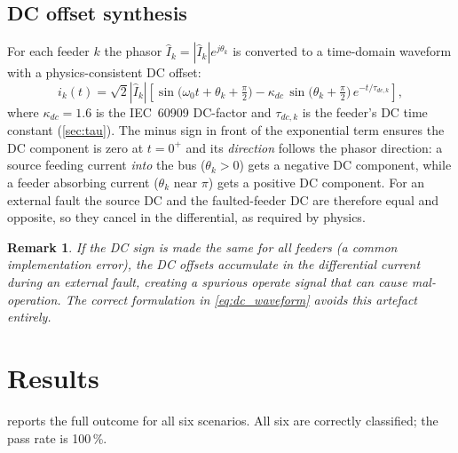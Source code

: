 \documentclass[12pt,a4paper]{article}
\newtheorem{remark}{Remark}[section]
\newcommand{\abs}[1]{\left|#1\right|}
\begin{document}
\subsection{DC offset synthesis}
\label{sec:dc}

For each feeder $k$ the phasor $\hat{I}_k = \abs{\hat{I}_k}e^{j\theta_k}$ is
converted to a time-domain waveform with a physics-consistent DC offset:
\begin{equation}
  i_k(t) = \sqrt{2}\abs{\hat{I}_k}
            \!\left[\sin\!\bigl(\omega_0 t + \theta_k + \tfrac{\pi}{2}\bigr)
                    - \kappa_{dc}\,\sin\!\bigl(\theta_k + \tfrac{\pi}{2}\bigr)\,
                      e^{-t/\tau_{dc,k}}\right],
  \label{eq:dc_waveform}
\end{equation}
where $\kappa_{dc}=1.6$ is the IEC~60909 DC-factor and $\tau_{dc,k}$ is the
feeder's DC time constant (\cref{sec:tau}).  The minus sign in front of the
exponential term ensures the DC component is zero at $t=0^+$ and its
\emph{direction} follows the phasor direction: a source feeding current
\emph{into} the bus ($\theta_k > 0$) gets a negative DC component, while a
feeder absorbing current ($\theta_k$ near $\pi$) gets a positive DC component.
For an external fault the source DC and the faulted-feeder DC are therefore
equal and opposite, so they cancel in the differential, as required by
physics.

\begin{remark}
  If the DC sign is made the same for all feeders (a common implementation
  error), the DC offsets \emph{accumulate} in the differential current during
  an external fault, creating a spurious operate signal that can cause
  mal-operation.  The correct formulation in \cref{eq:dc_waveform} avoids
  this artefact entirely.
\end{remark}

\section{Results}
\label{sec:results}

 reports the full outcome for all six scenarios.  All six
are correctly classified; the pass rate is 100\,\%.
\end{document}
